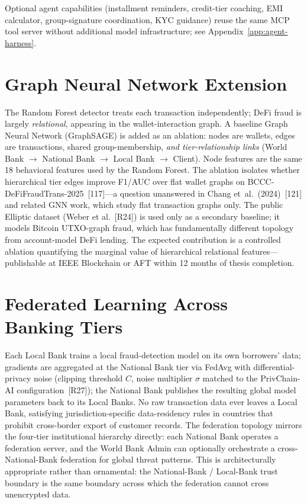 \documentclass[12pt,a4paper]{report}
\begin{document}
\noindent Optional agent capabilities (installment reminders, credit-tier coaching, EMI calculator, group-signature coordination, KYC guidance) reuse the same MCP tool server without additional model infrastructure; see Appendix~\ref{app:agent-harness}.

\section{Graph Neural Network Extension}
\label{sec:gnn-extension}

The Random Forest detector treats each transaction independently; DeFi fraud is largely \emph{relational}, appearing in the wallet-interaction graph. A baseline Graph Neural Network (GraphSAGE) is added as an ablation: nodes are wallets, edges are transactions, shared group-membership, \textit{and tier-relationship links} (World Bank $\to$ National Bank $\to$ Local Bank $\to$ Client). Node features are the same 18 behavioral features used by the Random Forest. The ablation isolates whether hierarchical tier edges improve F1/AUC over flat wallet graphs on BCCC-DeFiFraudTrans-2025~[117]---a question unanswered in Chang et~al.~(2024)~[121] and related GNN work, which study flat transaction graphs only. The public Elliptic dataset (Weber et al.~[R24]) is used only as a secondary baseline; it models Bitcoin UTXO-graph fraud, which has fundamentally different topology from account-model DeFi lending. The expected contribution is a controlled ablation quantifying the marginal value of hierarchical relational features---publishable at IEEE Blockchain or AFT within 12 months of thesis completion.

\section{Federated Learning Across Banking Tiers}
\label{sec:fl-fraud}

Each Local Bank trains a local fraud-detection model on its own borrowers' data; gradients are aggregated at the National Bank tier via FedAvg with differential-privacy noise (clipping threshold $C$, noise multiplier $\sigma$ matched to the PrivChain-AI configuration~[R27]); the National Bank publishes the resulting global model parameters back to its Local Banks. No raw transaction data ever leaves a Local Bank, satisfying jurisdiction-specific data-residency rules in countries that prohibit cross-border export of customer records. The federation topology mirrors the four-tier institutional hierarchy directly: each National Bank operates a federation server, and the World Bank Admin can optionally orchestrate a cross-National-Bank federation for global threat patterns. This is architecturally appropriate rather than ornamental: the National-Bank / Local-Bank trust boundary is the same boundary across which the federation cannot cross unencrypted data.
\end{document}
